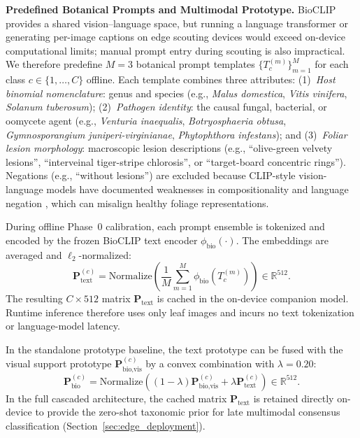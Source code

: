 \documentclass[conference]{IEEEtran}
\begin{document}
\medskip
\textbf{Predefined Botanical Prompts and Multimodal Prototype.} BioCLIP provides a shared vision--language space, but running a language transformer or generating per-image captions on edge scouting devices would exceed on-device computational limits; manual prompt entry during scouting is also impractical. We therefore predefine $M=3$ botanical prompt templates $\{T_c^{(m)}\}_{m=1}^M$ for each class $c \in \{1,\dots,C\}$ offline. Each template combines three attributes:
(1)~\textit{Host binomial nomenclature}: genus and species (e.g., \textit{Malus domestica}, \textit{Vitis vinifera}, \textit{Solanum tuberosum});
(2)~\textit{Pathogen identity}: the causal fungal, bacterial, or oomycete agent (e.g., \textit{Venturia inaequalis}, \textit{Botryosphaeria obtusa}, \textit{Gymnosporangium juniperi-virginianae}, \textit{Phytophthora infestans}); and
(3)~\textit{Foliar lesion morphology}: macroscopic lesion descriptions (e.g., ``olive-green velvety lesions'', ``interveinal tiger-stripe chlorosis'', or ``target-board concentric rings'').
Negations (e.g., ``without lesions'') are excluded because CLIP-style vision-language models have documented weaknesses in compositionality and language negation \cite{yuksekgonul2023when, alhamoud2025vision}, which can misalign healthy foliage representations.

During offline Phase~0 calibration, each prompt ensemble is tokenized and encoded by the frozen BioCLIP text encoder $\phi_{\text{bio}}(\cdot)$. The embeddings are averaged and $\ell_2$-normalized:
\begin{equation}
    \mathbf{P}_{\text{text}}^{(c)} = \text{Normalize}\left(\frac{1}{M}\sum_{m=1}^M \phi_{\text{bio}}(T_c^{(m)})\right) \in \mathbb{R}^{512}.
\end{equation}
The resulting $C \times 512$ matrix $\mathbf{P}_{\text{text}}$ is cached in the on-device companion model. Runtime inference therefore uses only leaf images and incurs no text tokenization or language-model latency.

In the standalone prototype baseline, the text prototype can be fused with the visual support prototype $\mathbf{P}_{\text{bio,vis}}^{(c)}$ by a convex combination with $\lambda = 0.20$:
\begin{equation}
    \mathbf{P}_{\text{bio}}^{(c)} = \text{Normalize}\left((1-\lambda)\mathbf{P}_{\text{bio,vis}}^{(c)} + \lambda \mathbf{P}_{\text{text}}^{(c)}\right) \in \mathbb{R}^{512}.
\end{equation}
In the full cascaded architecture, the cached matrix $\mathbf{P}_{\text{text}}$ is retained directly on-device to provide the zero-shot taxonomic prior for late multimodal consensus classification (Section~\ref{sec:edge_deployment}).
\end{document}
